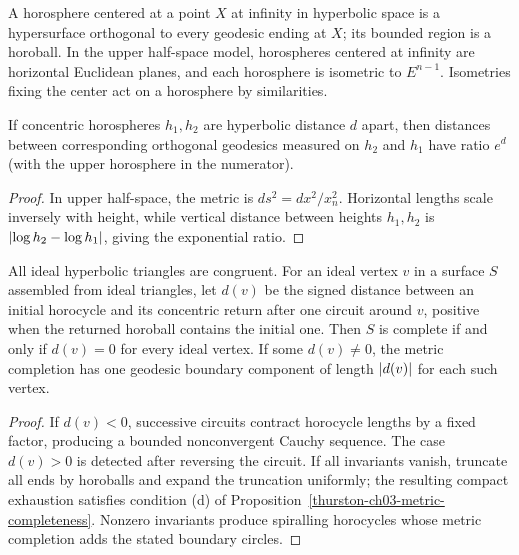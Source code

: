 \begin{definition}
\label{thurston-ch03-horosphere}

A horosphere centered at a point \(X\) at infinity in hyperbolic space is a hypersurface orthogonal to every geodesic ending at \(X\); its bounded region is a horoball. In the upper half-space model, horospheres centered at infinity are horizontal Euclidean planes, and each horosphere is isometric to \(E^{n-1}\). Isometries fixing the center act on a horosphere by similarities.
\end{definition}

\begin{lemma}
\label{thurston-ch03-horosphere-scaling}

If concentric horospheres \(h_1,h_2\) are hyperbolic distance \(d\) apart, then distances between corresponding orthogonal geodesics measured on \(h_2\) and \(h_1\) have ratio \(e^d\) (with the upper horosphere in the numerator).
\end{lemma}
\begin{proof}
\sketch In upper half-space, the metric is \(ds^2=dx^2/x_n^2\). Horizontal lengths scale inversely with height, while vertical distance between heights \(h_1,h_2\) is \(\lvert \log h_2-\log h_1\rvert\), giving the exponential ratio.
\end{proof}

\begin{theorem}
\label{thurston-ch03-ideal-triangle-completeness}

All ideal hyperbolic triangles are congruent. For an ideal vertex \(v\) in a surface \(S\) assembled from ideal triangles, let \(d(v)\) be the signed distance between an initial horocycle and its concentric return after one circuit around \(v\), positive when the returned horoball contains the initial one. Then \(S\) is complete if and only if \(d(v)=0\) for every ideal vertex. If some \(d(v)\ne0\), the metric completion has one geodesic boundary component of length \(\lvert d(v)\rvert\) for each such vertex.
\end{theorem}
\begin{proof}
\sketch If \(d(v)<0\), successive circuits contract horocycle lengths by a fixed factor, producing a bounded nonconvergent Cauchy sequence. The case \(d(v)>0\) is detected after reversing the circuit. If all invariants vanish, truncate all ends by horoballs and expand the truncation uniformly; the resulting compact exhaustion satisfies condition (d) of Proposition~\ref{thurston-ch03-metric-completeness}. Nonzero invariants produce spiralling horocycles whose metric completion adds the stated boundary circles.
\end{proof}

